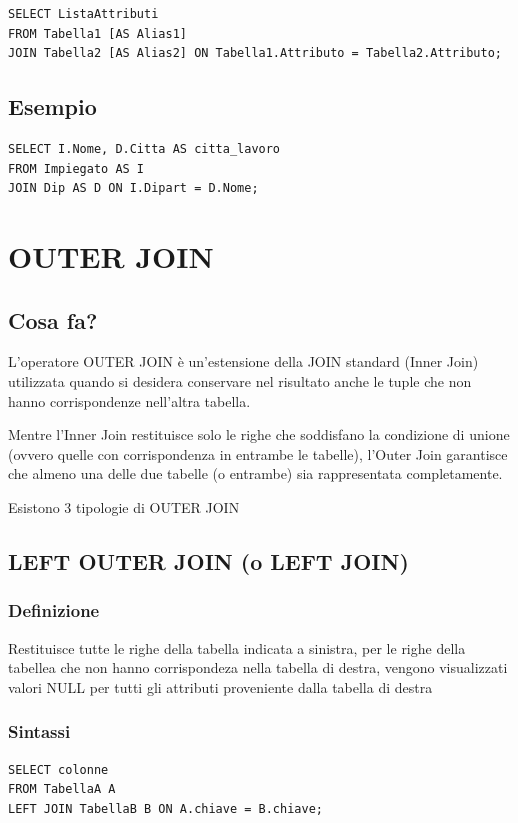 \begin{lstlisting}[language=sql_generic]
SELECT ListaAttributi
FROM Tabella1 [AS Alias1]
JOIN Tabella2 [AS Alias2] ON Tabella1.Attributo = Tabella2.Attributo;
\end{lstlisting}

\subsection{Esempio}
\begin{lstlisting}[language=sql_generic]
SELECT I.Nome, D.Citta AS citta_lavoro
FROM Impiegato AS I
JOIN Dip AS D ON I.Dipart = D.Nome;
\end{lstlisting}

\section{OUTER JOIN}
\subsection{Cosa fa?}
L'operatore OUTER JOIN è un'estensione della JOIN standard (Inner Join) utilizzata quando si desidera conservare nel risultato anche le tuple che non hanno corrispondenze nell'altra tabella.

Mentre l'Inner Join restituisce solo le righe che soddisfano la condizione di unione (ovvero quelle con corrispondenza in entrambe le tabelle), l'Outer Join garantisce che almeno una delle due tabelle (o entrambe) sia rappresentata completamente.

Esistono 3 tipologie di OUTER JOIN

\subsection{LEFT OUTER JOIN (o LEFT JOIN)}
\subsubsection{Definizione}
Restituisce tutte le righe della tabella indicata a sinistra, per le righe della tabellea che non hanno corrispondeza nella tabella di destra, vengono visualizzati valori NULL per tutti gli attributi proveniente dalla tabella di destra

\subsubsection{Sintassi}
\begin{lstlisting}[language=sql_generic]
SELECT colonne
FROM TabellaA A
LEFT JOIN TabellaB B ON A.chiave = B.chiave;
\end{lstlisting}

